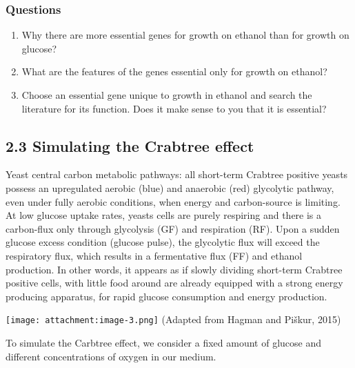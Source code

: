 \documentclass[11pt]{article}
\providecommand{\tightlist}{%
      \setlength{\itemsep}{0pt}\setlength{\parskip}{0pt}}
\begin{document}
    \hypertarget{questions}{%
\subsubsection{Questions}\label{questions}}

    \begin{enumerate}
\def\labelenumi{\arabic{enumi}.}
\tightlist
\item
  Why there are more essential genes for growth on ethanol than for
  growth on glucose?
\item
  What are the features of the genes essential only for growth on
  ethanol?
\item
  Choose an essential gene unique to growth in ethanol and search the
  literature for its function. Does it make sense to you that it is
  essential?
\end{enumerate}

    \hypertarget{simulating-the-crabtree-effect}{%
\subsection{2.3 Simulating the Crabtree
effect}\label{simulating-the-crabtree-effect}}

    Yeast central carbon metabolic pathways: all short-term Crabtree
positive yeasts possess an upregulated aerobic (blue) and anaerobic
(red) glycolytic pathway, even under fully aerobic conditions, when
energy and carbon-source is limiting. At low glucose uptake rates,
yeasts cells are purely respiring and there is a carbon-flux only
through glycolysis (GF) and respiration (RF). Upon a sudden glucose
excess condition (glucose pulse), the glycolytic flux will exceed the
respiratory flux, which results in a fermentative flux (FF) and ethanol
production. In other words, it appears as if slowly dividing short-term
Crabtree positive cells, with little food around are already equipped
with a strong energy producing apparatus, for rapid glucose consumption
and energy production.

\texttt{[image: attachment:image-3.png]} (Adapted from Hagman and
Piškur, 2015)

    To simulate the Carbtree effect, we consider a fixed amount of glucose
and different concentrations of oxygen in our medium.
\end{document}

